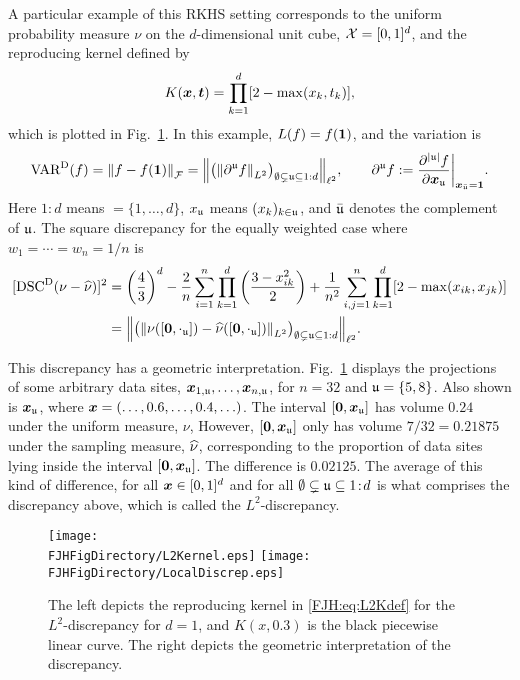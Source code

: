 \documentclass[graybox,footinfo]{svmult}
\begin{document}
A particular example of this RKHS setting corresponds to the uniform probability measure 
$\nu$ on the $d$-dimensional unit cube, ${\mathcal{X}} 
= 
[0,1]^d$, and the reproducing kernel defined by \cite{Hic97a}
\begin{equation} \label{FJH:eq:L2Kdef}
K(\bsx,\bst) =\prod_{k = 1}^d [2 - \max(x_k,t_k)],
\end{equation}
which is plotted in Fig.\ \ref{FJH:fig:L2ker}.  In this example, $L(f) = f({\boldsymbol{1}})$, and the 
variation is 
\begin{equation*}
\textup{VAR}^{\textup{D}}(f)  = \left \lVert f-f({\boldsymbol{1}}) \right \rVert_{\mathcal{F}} = \Bigl \lVert \bigl ( \left \lVert \partial^{\mathfrak{u}} 
f \right \rVert_{L^2}\bigr 
)_{\emptyset \subsetneq {\mathfrak{u}} \subseteq 1:d} \Bigr \rVert_{\ell^2} , \qquad 
\partial^{\mathfrak{u}} f : = \frac{\partial^{\lvert{\mathfrak{u}}\rvert} f}{\partial {\boldsymbol{x}}_{\mathfrak{u}}} \biggr 
\rvert_{{\boldsymbol{x}}_{\bar{{\mathfrak{u}}}} = {\boldsymbol{1}}}.
\end{equation*}
Here $1\!:\!d$ means  $= \{1, \ldots, d\}$, $x_{\mathfrak{u}}$ means $(x_k)_{k \in {\mathfrak{u}}}$, and 
$\bar{{\mathfrak{u}}}$ 
denotes the complement of ${\mathfrak{u}}$.  
The square discrepancy for the equally weighted case where $w_1 = \cdots = w_n = 1/n$ 
is
\begin{align}
\nonumber
[\disc^\Dt(\nu - \hnu)]^2  &= \left(\frac 43\right)^d - \frac{2}n \sum_{i=1}^n \prod_{k=1}^d 
\left (\frac{3 - x_{ik}^2}{2} \right) + \frac{1}{n^2}\sum_{i,j=1}^n \prod_{k = 1}^d [2 - 
\max(x_{ik},x_{jk})] 
\\ &= \Bigl \lVert \bigl ( \norm{\nu([\bszero,\cdot_\fraku]) - 
	\hnu([\bszero,\cdot_\fraku])}_{L^2}\bigr )_{\emptyset \subsetneq \fraku \subseteq 1:d} 
	\Bigr 
	\rVert_{\ell^2}. \label{FJH:eq:L2disc}
\end{align}

This discrepancy has a geometric interpretation. Fig.\ \ref{FJH:fig:L2ker} displays the 
projections of some arbitrary 
data sites, ${\boldsymbol{x}}_{1,{\mathfrak{u}}}, \ldots, {\boldsymbol{x}}_{n,{\mathfrak{u}}}$, for $n=32$ and ${\mathfrak{u}} = \{5,8\}$.  
Also 
shown is ${\boldsymbol{x}}_{\mathfrak{u}}$, where ${\boldsymbol{x}} = (\ldots, 0.6, \ldots, 0.4, \ldots)$. The interval 
$[{\boldsymbol{0}},{\boldsymbol{x}}_{\mathfrak{u}}]$ has volume $0.24$ under the uniform measure, $\nu$, However, 
$[{\boldsymbol{0}},{\boldsymbol{x}}_{\mathfrak{u}}]$ only has 
volume $7/32 = 0.21875$ under the sampling measure, $\widehat{\nu}$, corresponding to the 
proportion of data sites lying inside the interval $[{\boldsymbol{0}},{\boldsymbol{x}}_{\mathfrak{u}}]$. The difference is 
$0.02125$.  The average of this kind of difference, for all ${\boldsymbol{x}} \in [0,1]^d$ and for all 
$\emptyset \subsetneq {\mathfrak{u}} 
\subseteq 1\!:\!d$ is what comprises the discrepancy above, which is called the 
$L^2$-discrepancy. 
\begin{figure}
	\centering
	\texttt{[image: \\FJHFigDirectory/L2Kernel.eps]}\qquad
	\texttt{[image: \\FJHFigDirectory/LocalDiscrep.eps]}
	\caption{The left depicts the reproducing kernel in \eqref{FJH:eq:L2Kdef} for the 
	$L^2$-discrepancy 
	for $d=1$, and $K(x,0.3)$ is the black piecewise linear curve.  The right depicts the 
	geometric interpretation of the discrepancy.
	\label{FJH:fig:L2ker}}
\end{figure}
\end{document}
